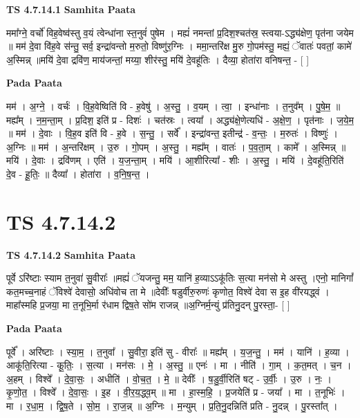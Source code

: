 \documentclass[17pt]{extarticle}
\begin{document}
\textbf{TS 4.7.14.1 } \newline
\textbf{Samhita Paata} \newline

ममा᳚ग्ने॒ वर्चो॑ विह॒वेष्व॑स्तु व॒यं त्वेन्धा॑ना स्त॒नुवं॑ पुषेम । मह्यं॑ नमन्तां प्र॒दिश॒श्चत॑स्र॒ स्त्वया-ऽद्ध्य॑क्षेण॒ पृत॑ना जयेम ॥ मम॑ दे॒वा वि॑ह॒वे स॑न्तु॒ सर्व॒ इन्द्रा॑वन्तो म॒रुतो॒ विष्णु॑र॒ग्निः । ममा॒न्तरि॑क्ष मु॒रु गो॒पम॑स्तु॒ मह्यं॒ ॅवातः॑ पवतां॒ कामे॑ अ॒स्मिन्न् ॥मयि॑ दे॒वा द्रवि॑ण॒ माय॑जन्तां॒ मय्या॒ शीर॑स्तु॒ मयि॑ दे॒वहू॑तिः । दैव्या॒ होता॑रा वनिषन्त॒ - [  ] \newline

\textbf{Pada Paata} \newline

मम॑ । अ॒ग्ने॒ । वर्चः॑ । वि॒ह॒वेष्विति॑ वि - ह॒वेषु॑ । अ॒स्तु॒ । व॒यम् । त्वा॒ । इन्धा॑नाः । त॒नुव᳚म् । पु॒षे॒म॒ ॥ मह्य᳚म् । न॒म॒न्ता॒म् । प्र॒दिश॒ इति॑ प्र - दिशः॑ । चत॑स्रः । त्वया᳚ । अद्ध्य॑क्षे॒णेत्यधि॑ - अ॒क्षे॒ण॒ । पृत॑नाः । ज॒ये॒म॒ ॥ मम॑ । दे॒वाः । वि॒ह॒व इति॑ वि - ह॒वे । स॒न्तु॒ । सर्वे᳚ । इन्द्रा॑वन्त॒ इतीन्द्र॑ - व॒न्तः॒ । म॒रुतः॑ । विष्णुः॑ । अ॒ग्निः ॥ मम॑ । अ॒न्तरि॑क्षम् । उ॒रु । गो॒पम् । अ॒स्तु॒ । मह्य᳚म् । वातः॑ । प॒व॒ता॒म् । कामे᳚ । अ॒स्मिन्न् ॥ मयि॑ । दे॒वाः । द्रवि॑णम् । एति॑ । य॒ज॒न्ता॒म् । मयि॑ । आ॒शीरित्या᳚ - शीः । अ॒स्तु॒ । मयि॑ । दे॒वहू॑ति॒रिति॑ दे॒व - हू॒तिः॒ ॥ दैव्या᳚ । होता॑रा । व॒नि॒ष॒न्त॒ ।  \newline





\section{ TS 4.7.14.2 }

\textbf{TS 4.7.14.2 } \newline
\textbf{Samhita Paata} \newline

पूर्वे ऽरि॑ष्टाः स्याम त॒नुवा॑ सु॒वीराः᳚ ॥मह्यं॑ ॅयजन्तु॒ मम॒ यानि॑ ह॒व्याऽऽकू॑तिः स॒त्या मन॑सो मे अस्तु ।एनो॒ मानिगां᳚ कत॒मच्च॒नाहं ॅविश्वे॑ देवासो॒ अधि॑वोच ता मे ॥देवीः᳚ षडुर्वीरु॒रुणः॑ कृणोत॒ विश्वे॑ देवा स इ॒ह वी॑रयद्ध्वं ।माहा᳚स्महि प्र॒जया॒ मा त॒नूभि॒र्मा र॑धाम द्विष॒ते सो॑म राजन्न् ॥अ॒ग्निर्म॒न्युं प्र॑तिनु॒दन् पु॒रस्ता॒- [  ] \newline

\textbf{Pada Paata} \newline

पूर्वे᳚ । अरि॑ष्टाः । स्या॒म॒ । त॒नुवा᳚ । सु॒वीरा॒ इति॑ सु - वीराः᳚ ॥ मह्य᳚म् । य॒ज॒न्तु॒ । मम॑ । यानि॑ । ह॒व्या । आकू॑ति॒रित्या - कू॒तिः॒ । स॒त्या । मन॑सः । मे॒ । अ॒स्तु॒ ॥ एनः॑ । मा । नीति॑ । गा॒म् । क॒त॒मत् । च॒न । अ॒हम् । विश्वे᳚ । दे॒वा॒सः॒ । अधीति॑ । वो॒च॒त॒ । मे॒ ॥ देवीः᳚ । ष॒डु॒र्वी॒रिति॑ षट् - उ॒र्वीः॒ । उ॒रु । नः॒ । कृ॒णो॒त॒ । विश्वे᳚ । दे॒वा॒सः॒ । इ॒ह । वी॒र॒य॒द्ध्व॒म् ॥ मा । हा॒स्म॒हि॒ । प्र॒जयेति॑ प्र - जया᳚ । मा । त॒नूभिः॑ । मा । र॒धा॒म॒ । द्वि॒ष॒ते । सो॒म॒ । रा॒ज॒न्न् ॥ अ॒ग्निः । म॒न्युम् । प्र॒ति॒नु॒दन्निति॑ प्रति - नु॒दन्न् । पु॒रस्ता᳚त् ।  \newline
\end{document}
